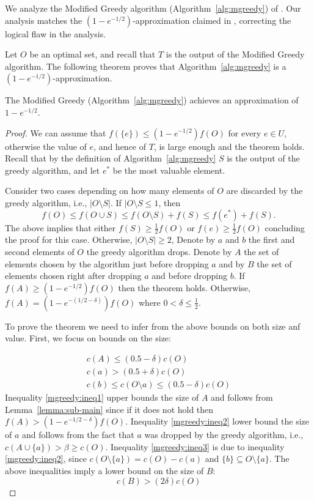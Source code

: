 We analyze the Modified Greedy algorithm (Algorithm~\ref{alg:mgreedy}) of \cite{khuller1999budgeted}.
Our analysis matches the $(1 - e^{-1/2})$-approximation claimed in \cite[]{khuller1999budgeted}, correcting the logical flaw in the analysis.

Let $O$ be an optimal set, and recall that $T$ is the output of the Modified Greedy algorithm.
The following theorem proves that Algorithm~\ref{alg:mgreedy} is a $(1-e^{-1/2})$-approximation.

\begin{theorem}
	\label{theorem:mgreedy}
	The Modified Greedy (Algorithm~\ref{alg:mgreedy}) achieves an approximation of $1 - e^{-1/2}$.
\end{theorem}

\begin{proof}
	We can assume that $f(\{e\}) \leq (1 - e^{-1/2})f(O)$ for every $e \in U$, otherwise the value of $e$, and hence of $T$, is large enough and the theorem holds.
	Recall that by the definition of Algorithm~\ref{alg:mgreedy} $S$ is the output of the greedy algorithm, and let $e^*$ be the most valuable element.
	
	Consider two cases depending on how many elements of $O$ are discarded by the greedy algorithm, i.e., $|O \setminus S|$.
	If $|O \setminus S \leq 1$, then 
	$$
	f(O) \leq f(O \cup S) \leq f(O \setminus S) + f(S) \leq f(e^*) + f(S).
	$$
	The above implies that either $f(S) \geq \frac{1}{2}f(O)$ or $f(e) \geq \frac{1}{2}f(O)$ concluding the proof for this case.
	Otherwise, $|O \setminus S| \geq 2$,
	Denote by $a$ and $b$ the first and second elements of $O$ the greedy algorithm drops.
	Denote by $A$ the set of elements chosen by the algorithm just before dropping $a$ and by
	$B$ the set of elements chosen right after dropping $a$ and before dropping $b$.
	If $f(A) \geq (1 - e^{-1/2})f(O)$ then the theorem holds.
	Otherwise, $f(A) = (1 - e^{-(1/2 - \delta)})f(O)$ where $0 < \delta \leq \frac{1}{2}$.

	To prove the theorem we need to infer from the above bounds on both size anf value.
	First, we focus on bounds on the size:

	\begin{align}
		\label{mgreedy:ineq1}
		c(A) \leq (0.5 - \delta)c(O)
		\\
		\label{mgreedy:ineq2}
		c(a) > (0.5 + \delta)c(O)
		\\
		\label{mgreedy:ineq3}
		c(b) \leq c(O \setminus a) \leq (0.5 - \delta)c(O)
	\end{align}
	Inequality \ref{mgreedy:ineq1} upper bounds the size of $A$ and follows from  Lemma~\ref{lemma:sub-main} since if it does not hold then $f(A) > (1 - e^{-1/2 - \delta})f(O)$.
	Inequality \ref{mgreedy:ineq2} lower bound the size of $a$ and follows from the fact that $a$ was dropped by the greedy algorithm, i.e., $c(A \cup \{a\}) > \beta \geq c(O)$. Inequality \ref{mgreedy:ineq3} is due to inequality \ref{mgreedy:ineq2}, since $c(O \setminus \{a\}) = c(O) - c(a)$ and $\{b\} \subseteq O \setminus \{a\}$.
	The above inequalities imply a lower bound  on the size of $B$:
	\begin{equation}
		\label{mgreedy:ineq4}
		c(B) > (2\delta)c(O)
	\end{equation}


\end{proof}
